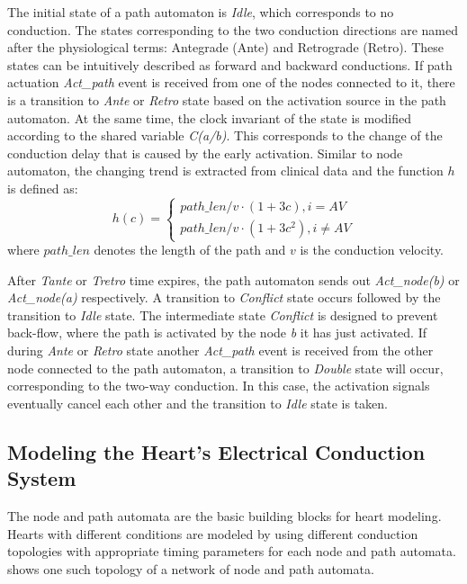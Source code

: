 The initial state of a path automaton is \emph{Idle}, which corresponds to no conduction. The states corresponding to the two conduction directions are named after the physiological terms: Antegrade (Ante) and Retrograde (Retro). These states can be intuitively described as forward and backward conductions. If path actuation \emph{Act\_path} event is received from one of the nodes connected to it, there is a transition to \emph{Ante} or \emph{Retro} state based on the activation source in the path automaton. At the same time, the clock invariant of the state is modified according to the shared variable \emph{C(a/b)}. This corresponds to the change of the conduction delay that is caused by the early activation. Similar to node automaton, the changing trend is extracted from clinical data and the function $h$ is defined as:
\begin{equation} 
						h(c) = \left\{
						\begin{array}{lr}
						
						path\_len/v\cdot (1+3c), i=AV\\
						path\_len/v\cdot (1+3c^2), i\neq AV
						\end{array}
						\right.
						\end{equation}
where $path\_len$ denotes the length of the path and $v$ is the conduction velocity.

After \emph{Tante} or \emph{Tretro} time expires, the path automaton sends out \emph{Act\_node(b)} or \emph{Act\_node(a)} respectively. A transition to \emph{Conflict} state occurs followed by the transition to \emph{Idle} state. The intermediate state \emph{Conflict} is designed to prevent back-flow, where the path is activated by the node \emph{b} it has just activated. If during \emph{Ante} or \emph{Retro} state another \emph{Act\_path} event is received from the other node connected to the path automaton, a transition to \emph{Double} state will occur, corresponding to the two-way conduction. In this case, the activation signals eventually cancel each other and the transition to \emph{Idle} state is taken.

\subsection{Modeling the Heart's Electrical Conduction System}
The node and path automata are the basic building blocks for heart modeling. Hearts with different conditions are modeled by using different conduction topologies with appropriate timing parameters for each node and path automata.  shows one such  topology of a network of node and path automata.


